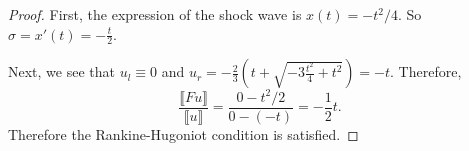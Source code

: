 \begin{enumerate}
\begin{proof}
	First, the expression of the shock wave is $x(t) = - t^2 / 4$. So $\sigma = x'(t) = - \frac{t}{2}$.

	Next, we see that $u_l \equiv 0$ and $u_r = -\frac{2}{3}\left( t + \sqrt{-3 \frac{t^2}{4} + t^2}  \right) = -t $. Therefore, 
	 \[
		\frac{\llbracket F u \rrbracket}{\llbracket u \rrbracket} = \frac{0-t^2 / 2}{0 - (-t)} = - \frac{1}{2} t
	.\] 
	Therefore the Rankine-Hugoniot condition is satisfied.
\end{proof}


\end{enumerate}
